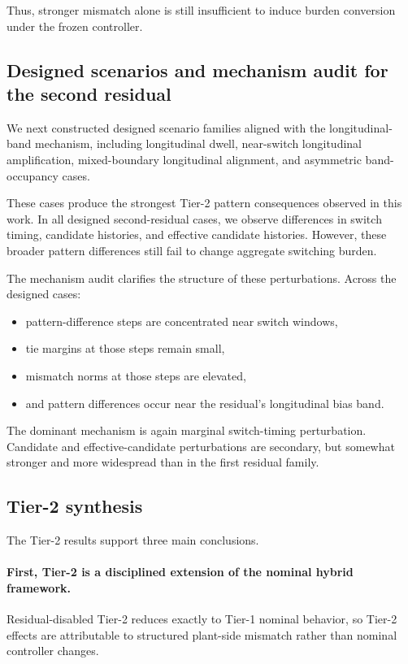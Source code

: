 Thus, stronger mismatch alone is still insufficient to induce burden conversion under the frozen controller.

\subsection{Designed scenarios and mechanism audit for the second residual}
\label{subsec:tier2_longitudinal_mechanism}

We next constructed designed scenario families aligned with the longitudinal-band mechanism, including longitudinal dwell, near-switch longitudinal amplification, mixed-boundary longitudinal alignment, and asymmetric band-occupancy cases.

These cases produce the strongest Tier-2 pattern consequences observed in this work. In all designed second-residual cases, we observe differences in switch timing, candidate histories, and effective candidate histories. However, these broader pattern differences still fail to change aggregate switching burden.

The mechanism audit clarifies the structure of these perturbations. Across the designed cases:
\begin{itemize}
    \item pattern-difference steps are concentrated near switch windows,
    \item tie margins at those steps remain small,
    \item mismatch norms at those steps are elevated,
    \item and pattern differences occur near the residual's longitudinal bias band.
\end{itemize}

The dominant mechanism is again marginal switch-timing perturbation. Candidate and effective-candidate perturbations are secondary, but somewhat stronger and more widespread than in the first residual family.

\subsection{Tier-2 synthesis}
\label{subsec:tier2_synthesis}

The Tier-2 results support three main conclusions.

\paragraph{First, Tier-2 is a disciplined extension of the nominal hybrid framework.}
Residual-disabled Tier-2 reduces exactly to Tier-1 nominal behavior, so Tier-2 effects are attributable to structured plant-side mismatch rather than nominal controller changes.

